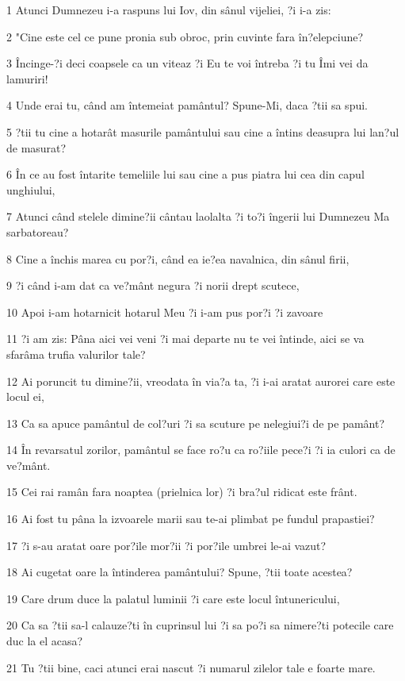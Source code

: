\par 1 Atunci Dumnezeu i-a raspuns lui Iov, din sânul vijeliei, ?i i-a zis:
\par 2 "Cine este cel ce pune pronia sub obroc, prin cuvinte fara în?elepciune?
\par 3 Încinge-?i deci coapsele ca un viteaz ?i Eu te voi întreba ?i tu Îmi vei da lamuriri!
\par 4 Unde erai tu, când am întemeiat pamântul? Spune-Mi, daca ?tii sa spui.
\par 5 ?tii tu cine a hotarât masurile pamântului sau cine a întins deasupra lui lan?ul de masurat?
\par 6 În ce au fost întarite temeliile lui sau cine a pus piatra lui cea din capul unghiului,
\par 7 Atunci când stelele dimine?ii cântau laolalta ?i to?i îngerii lui Dumnezeu Ma sarbatoreau?
\par 8 Cine a închis marea cu por?i, când ea ie?ea navalnica, din sânul firii,
\par 9 ?i când i-am dat ca ve?mânt negura ?i norii drept scutece,
\par 10 Apoi i-am hotarnicit hotarul Meu ?i i-am pus por?i ?i zavoare
\par 11 ?i am zis: Pâna aici vei veni ?i mai departe nu te vei întinde, aici se va sfarâma trufia valurilor tale?
\par 12 Ai poruncit tu dimine?ii, vreodata în via?a ta, ?i i-ai aratat aurorei care este locul ei,
\par 13 Ca sa apuce pamântul de col?uri ?i sa scuture pe nelegiui?i de pe pamânt?
\par 14 În revarsatul zorilor, pamântul se face ro?u ca ro?iile pece?i ?i ia culori ca de ve?mânt.
\par 15 Cei rai ramân fara noaptea (prielnica lor) ?i bra?ul ridicat este frânt.
\par 16 Ai fost tu pâna la izvoarele marii sau te-ai plimbat pe fundul prapastiei?
\par 17 ?i s-au aratat oare por?ile mor?ii ?i por?ile umbrei le-ai vazut?
\par 18 Ai cugetat oare la întinderea pamântului? Spune, ?tii toate acestea?
\par 19 Care drum duce la palatul luminii ?i care este locul întunericului,
\par 20 Ca sa ?tii sa-l calauze?ti în cuprinsul lui ?i sa po?i sa nimere?ti potecile care duc la el acasa?
\par 21 Tu ?tii bine, caci atunci erai nascut ?i numarul zilelor tale e foarte mare.
